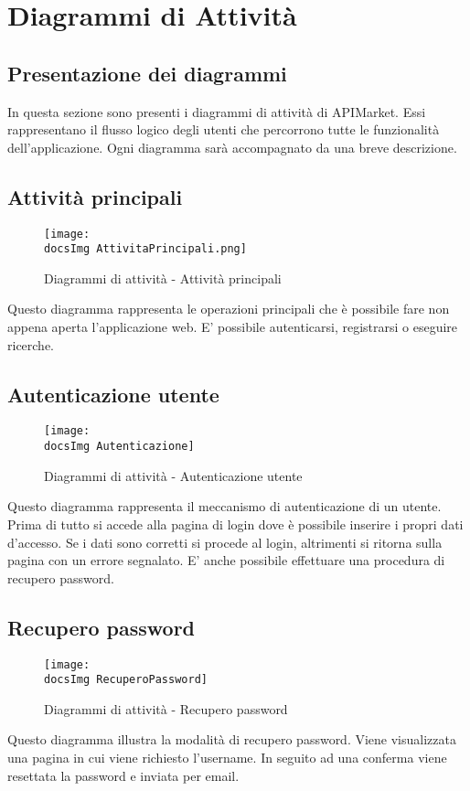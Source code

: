 \section{Diagrammi di Attività}{
	\subsection{Presentazione dei diagrammi}{
		In questa sezione sono presenti i diagrammi di attività di APIMarket. Essi rappresentano il flusso logico degli utenti che percorrono tutte le funzionalità dell'applicazione. Ogni diagramma sarà accompagnato da una breve descrizione.
	}
	\subsection{Attività principali}{
		\begin{figure}[H]
			\centering
			\texttt{[image: \\docsImg AttivitaPrincipali.png]}
			\caption{Diagrammi di attività - Attività principali}
		\end{figure}
			Questo diagramma rappresenta le operazioni principali che è possibile fare non appena aperta l'applicazione web. E' possibile autenticarsi, registrarsi o eseguire ricerche. 	
	}
	\subsection{Autenticazione utente} {
		\begin{figure}[H]
			\centering
			\texttt{[image: \\docsImg Autenticazione]}
			\caption{Diagrammi di attività - Autenticazione utente}
		\end{figure}
			Questo diagramma rappresenta il meccanismo di autenticazione di un utente. Prima di tutto si accede alla pagina di login dove è possibile inserire i propri dati d'accesso. Se i dati sono corretti si procede al login, altrimenti si ritorna sulla pagina con un errore segnalato. E' anche possibile effettuare una procedura di recupero password. 
	}
	\subsection{Recupero password}{
		\begin{figure}[H]
			\centering
			\texttt{[image: \\docsImg RecuperoPassword]}
			\caption{Diagrammi di attività - Recupero password}
		\end{figure}
			Questo diagramma illustra la modalità di recupero password. Viene visualizzata una pagina in cui viene richiesto l'username. In seguito ad una conferma viene resettata la password e inviata per email.
	}
}
